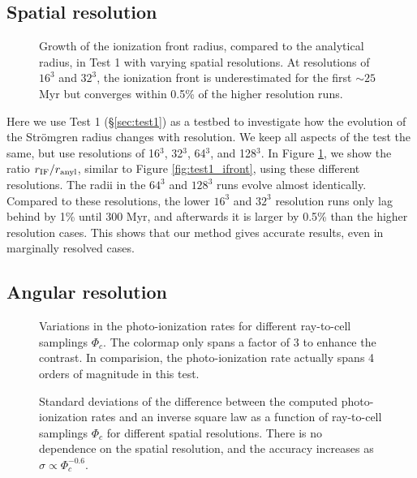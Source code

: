 \documentclass[12pt,preprint]{aastex}
\begin{document}
\subsection{Spatial resolution}

\begin{figure}[t]
  \caption{\label{fig:dx_dep1} Growth of the ionization front radius,
    compared to the analytical radius, in Test 1 with varying spatial
    resolutions.  At resolutions of $16^3$ and $32^3$, the ionization
    front is underestimated for the first $\sim25$ Myr but converges
    within 0.5\% of the higher resolution runs.}
\end{figure}

Here we use Test 1 (\S\ref{sec:test1}) as a testbed to investigate how
the evolution of the Str\"{o}mgren radius changes with resolution.  We
keep all aspects of the test the same, but use resolutions of 16$^3$,
32$^3$, 64$^3$, and 128$^3$.  In Figure \ref{fig:dx_dep1}, we show the
ratio $r_{\rm IF}/r_{\rm anyl}$, similar to Figure
\ref{fig:test1_ifront}, using these different resolutions.  The radii
in the $64^3$ and $128^3$ runs evolve almost identically.  Compared to
these resolutions, the lower $16^3$ and $32^3$ resolution runs only
lag behind by 1\% until 300 Myr, and afterwards it is larger by 0.5\%
than the higher resolution cases.  This shows that our method gives
accurate results, even in marginally resolved cases.

\subsection{Angular resolution}
\label{sec:ang_dep}

\begin{figure}[t]
  \caption{\label{fig:ang_dep1} Variations in the photo-ionization
    rates for different ray-to-cell samplings $\Phi_c$.  The colormap
    only spans a factor of 3 to enhance the contrast.  In comparision,
    the photo-ionization rate actually spans 4 orders of magnitude in
    this test.}
\end{figure}

\begin{figure}[t]
  \caption{\label{fig:ang_dep2} Standard deviations of the difference
    between the computed photo-ionization rates and an inverse square
    law as a function of ray-to-cell samplings $\Phi_c$ for different
    spatial resolutions.  There is no dependence on the spatial
    resolution, and the accuracy increases as $\sigma \propto
    \Phi_c^{-0.6}$.}
\end{figure}
\end{document}
